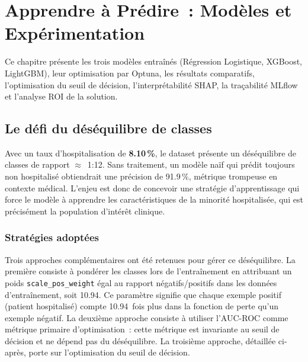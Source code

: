 \chapter{Apprendre à Prédire~: Modèles et Expérimentation}
\label{chap:modeles}

\begin{infobox}
Ce chapitre présente les trois modèles entraînés (Régression Logistique, XGBoost,
LightGBM), leur optimisation par Optuna, les résultats comparatifs, l'optimisation
du seuil de décision, l'interprétabilité SHAP, la traçabilité MLflow et l'analyse
ROI de la solution.
\end{infobox}

\section{Le défi du déséquilibre de classes}

Avec un taux d'hospitalisation de \textbf{8.10\,\%}, le dataset présente un
déséquilibre de classes de rapport $\approx$~1:12. Sans traitement, un modèle
naïf qui prédit toujours \og non hospitalisé\fg{} obtiendrait une précision de 91.9\,\%,
métrique trompeuse en contexte médical. L'enjeu est donc de concevoir une stratégie
d'apprentissage qui force le modèle à apprendre les caractéristiques de la minorité
hospitalisée, qui est précisément la population d'intérêt clinique.

\subsection{Stratégies adoptées}

Trois approches complémentaires ont été retenues pour gérer ce déséquilibre. La
première consiste à pondérer les classes lors de l'entraînement en attribuant un
poids \texttt{scale\_pos\_weight} égal au rapport négatifs/positifs dans les données
d'entraînement, soit 10.94. Ce paramètre signifie que chaque exemple positif (patient
hospitalisé) compte 10.94~fois plus dans la fonction de perte qu'un exemple négatif.
La deuxième approche consiste à utiliser l'AUC-ROC comme métrique primaire d'optimisation~:
cette métrique est invariante au seuil de décision et ne dépend pas du déséquilibre.
La troisième approche, détaillée ci-après, porte sur l'optimisation du seuil de décision.

